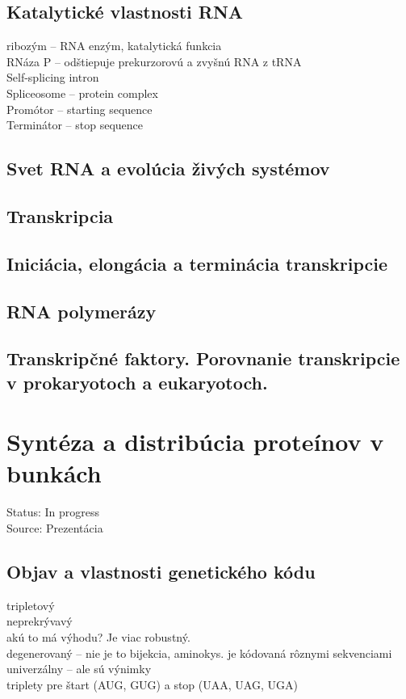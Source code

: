 \subsection{Katalytické vlastnosti RNA}
ribozým -- RNA enzým, katalytická funkcia\\
RNáza P -- odštiepuje prekurzorovú a zvyšnú RNA z tRNA\\
Self-splicing intron\\
Spliceosome -- protein complex\\
Promótor -- starting sequence\\
Terminátor -- stop sequence\\
\subsection{Svet RNA a evolúcia živých systémov}

\subsection{Transkripcia}

\subsection{Iniciácia, elongácia a terminácia transkripcie}

\subsection{RNA polymerázy}

\subsection{Transkripčné faktory. Porovnanie transkripcie v prokaryotoch a eukaryotoch.}

\section{Syntéza a distribúcia proteínov v bunkách}

Status: In progress\\
Source: Prezentácia \\

\subsection{Objav a vlastnosti genetického kódu}
tripletový\\
neprekrývavý\\
\tab akú to má výhodu? Je viac robustný. \\
degenerovaný -- nie je to bijekcia, aminokys. je kódovaná rôznymi sekvenciami\\
univerzálny -- ale sú výnimky\\
triplety pre štart (AUG, GUG) a stop (UAA, UAG, UGA)\\

